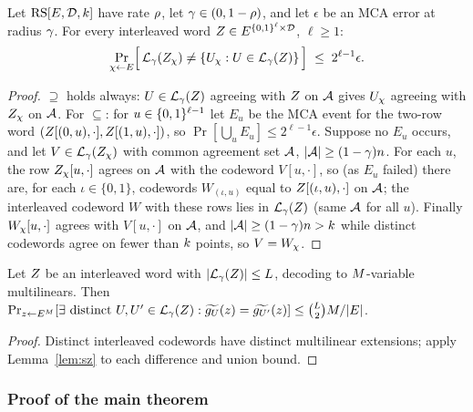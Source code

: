 \begin{lemma}\label{lem:fold-list}
Let $\mathrm{RS}[E,\mathcal{D},k]$ have rate $\rho$, let $\gamma \in (0, 1-\rho)$, and let $\epsilon$ be an MCA error at radius $\gamma$. For every interleaved word $Z \in E^{\{0,1\}^{\ell} \times \mathcal{D}}$, $\ell \ge 1$:
\[
\Pr_{\chi \leftarrow E}\Bigl[\, \mathcal{L}_\gamma(Z_\chi) \neq \{ U_\chi : U \in \mathcal{L}_\gamma(Z) \} \,\Bigr] \;\le\; 2^{\ell-1} \epsilon .
\]
\end{lemma}

\begin{proof}
$\supseteq$ holds always: $U \in \mathcal{L}_\gamma(Z)$ agreeing with $Z$ on $\mathcal{A}$ gives $U_\chi$ agreeing with $Z_\chi$ on $\mathcal{A}$. For $\subseteq$: for $u \in \{0,1\}^{\ell-1}$ let $E_u$ be the MCA event for the two-row word $(Z[(0,u),\cdot], Z[(1,u),\cdot])$, so $\Pr[\bigcup_u E_u] \le 2^{\ell-1}\epsilon$. Suppose no $E_u$ occurs, and let $V \in \mathcal{L}_\gamma(Z_\chi)$ with common agreement set $\mathcal{A}$, $|\mathcal{A}| \ge (1-\gamma)n$. For each $u$, the row $Z_\chi[u,\cdot]$ agrees on $\mathcal{A}$ with the codeword $V[u,\cdot]$, so (as $E_u$ failed) there are, for each $\iota \in \{0,1\}$, codewords $W_{(\iota,u)}$ equal to $Z[(\iota,u),\cdot]$ on $\mathcal{A}$; the interleaved codeword $W$ with these rows lies in $\mathcal{L}_\gamma(Z)$ (same $\mathcal{A}$ for all $u$). Finally $W_\chi[u,\cdot]$ agrees with $V[u,\cdot]$ on $\mathcal{A}$, and $|\mathcal{A}| \ge (1-\gamma)n > k$ while distinct codewords agree on fewer than $k$ points, so $V = W_\chi$.
\end{proof}

\begin{lemma}\label{lem:ood}
Let $Z$ be an interleaved word with $|\mathcal{L}_\gamma(Z)| \le L$, decoding to $M$-variable multilinears. Then $\Pr_{z \leftarrow E^{M}}[\exists \text{ distinct } U, U' \in \mathcal{L}_\gamma(Z) : \widetilde{g_U}(z) = \widetilde{g_{U'}}(z)] \le \binom{L}{2} M / |E|$.
\end{lemma}

\begin{proof}
Distinct interleaved codewords have distinct multilinear extensions; apply Lemma~\ref{lem:sz} to each difference and union bound.
\end{proof}

\subsubsection{Proof of the main theorem}\label{pcs:proof}

